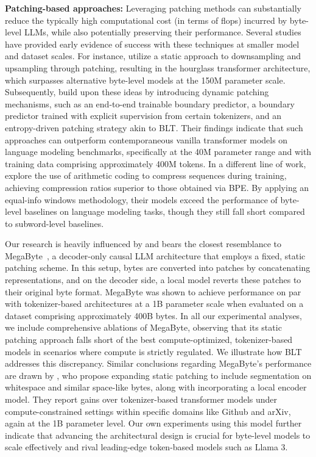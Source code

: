 \textbf{Patching-based approaches:} Leveraging patching methods can substantially reduce the typically high computational cost (in terms of flops) incurred by byte-level LLMs, while also potentially preserving their performance. Several studies have provided early evidence of success with these techniques at smaller model and dataset scales. For instance, \cite{nawrot-etal-2022-hierarchical} utilize a static approach to downsampling and upsampling through patching, resulting in the hourglass transformer architecture, which surpasses alternative byte-level models at the 150M parameter scale. Subsequently, \cite{nawrot-etal-2023-efficient} build upon these ideas by introducing dynamic patching mechanisms, such as an end-to-end trainable boundary predictor, a boundary predictor trained with explicit supervision from certain tokenizers, and an entropy-driven patching strategy akin to {\textsc BLT}. Their findings indicate that such approaches can outperform contemporaneous vanilla transformer models on language modeling benchmarks, specifically at the 40M parameter range and with training data comprising approximately 400M tokens. In a different line of work, \cite{lester2024training} explore the use of arithmetic coding to compress sequences during training, achieving compression ratios superior to those obtained via BPE. By applying an equal-info windows methodology, their models exceed the performance of byte-level baselines on language modeling tasks, though they still fall short compared to subword-level baselines.

Our research is heavily influenced by and bears the closest resemblance to MegaByte~\citep{yu2023megabyte}, a decoder-only causal LLM architecture that employs a fixed, static patching scheme. In this setup, bytes are converted into patches by concatenating representations, and on the decoder side, a local model reverts these patches to their original byte format. MegaByte was shown to achieve performance on par with tokenizer-based architectures at a 1B parameter scale when evaluated on a dataset comprising approximately 400B bytes. In all our experimental analyses, we include comprehensive ablations of MegaByte, observing that its static patching approach falls short of the best compute-optimized, tokenizer-based models in scenarios where compute is strictly regulated. We illustrate how {\textsc BLT} addresses this discrepancy. Similar conclusions regarding MegaByte's performance are drawn by \cite{slagle2024spacebyte}, who propose expanding static patching to include segmentation on whitespace and similar space-like bytes, along with incorporating a local encoder model. They report gains over tokenizer-based transformer models under compute-constrained settings within specific domains like Github and arXiv, again at the 1B parameter level. Our own experiments using this model further indicate that advancing the architectural design is crucial for byte-level models to scale effectively and rival leading-edge token-based models such as Llama 3.

